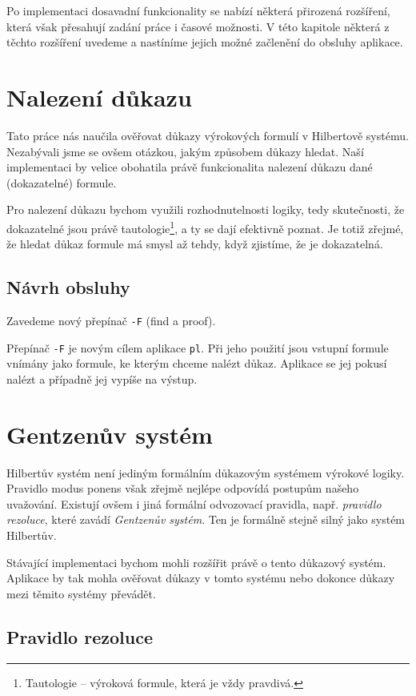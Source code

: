\documentclass[thesis=B,czech,hidelinks]{thesis}[2012/06/26]
\begin{document}
Po implementaci dosavadní funkcionality se nabízí některá přirozená rozšíření, která však přesahují zadání práce i časové možnosti. V této kapitole některá z těchto rozšíření uvedeme a nastíníme jejich možné začlenění do obsluhy aplikace.

\section{Nalezení důkazu}

Tato práce nás naučila ověřovat důkazy výrokových formulí v Hilbertově systému. Nezabývali jsme se ovšem otázkou, jakým způsobem důkazy hledat. Naší implementaci by velice obohatila právě funkcionalita nalezení důkazu dané (dokazatelné) formule.

Pro nalezení důkazu bychom využili rozhodnutelnosti logiky, tedy skutečnosti, že dokazatelné jsou právě tautologie\footnote{Tautologie -- výroková formule, která je vždy pravdivá.}, a ty se dají efektivně poznat. Je totiž zřejmé, že hledat důkaz formule má smysl až tehdy, když zjistíme, že je dokazatelná.

\subsection{Návrh obsluhy}

Zavedeme nový přepínač \texttt{-F} (find a proof).

Přepínač \texttt{-F} je novým cílem aplikace \texttt{pl}. Při jeho použití jsou vstupní formule vnímány jako formule, ke kterým chceme nalézt důkaz. Aplikace se jej pokusí nalézt a případně jej vypíše na výstup.

\section{Gentzenův systém}

Hilbertův systém není jediným formálním důkazovým systémem výrokové logiky. Pravidlo modus ponens však zřejmě nejlépe odpovídá postupům našeho uvažování\cite{sochor}. Existují ovšem i jiná formální odvozovací pravidla, např. \emph{pravidlo rezoluce}, které zavádí \emph{Gentzenův systém}. Ten je formálně stejně silný jako systém Hilbertův\cite{stary}.

Stávající implementaci bychom mohli rozšířit právě o tento důkazový systém. Aplikace by tak mohla ověřovat důkazy v tomto systému nebo dokonce důkazy mezi těmito systémy převádět.

\subsection{Pravidlo rezoluce}
\end{document}
